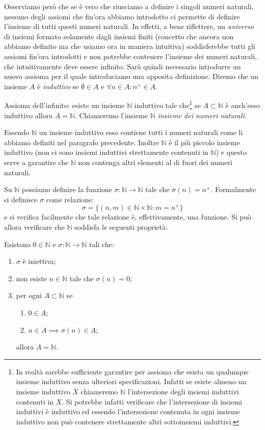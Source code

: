 \documentclass[italian,a4paper,hidelinks]{scrartcl}
\newcommand{\NN}{{\mathbb N}}
\newcommand{\myemph}[1]{\emph{#1}\marginpar{#1}}
\begin{document}
Osserviamo però che se è vero che riusciamo a definire i singoli numeri naturali,
nessuno degli assiomi che fin'ora abbiamo introdotto ci permette di definire
l'insieme di tutti questi numeri naturali.
In effetti, a bene riflettere, un \emph{universo} di insiemi formato solamente
dagli insiemi finiti (concetto che ancora non abbiamo definito ma che usiamo ora
in maniera intuitiva) soddisferebbe tutti gli assiomi fin'ora introdotti e non
potrebbe contenere l'insieme dei numeri naturali, che intuitivamente deve essere
infinito.
Sarà quindi necessario introdurre un nuovo assioma per il quale
introduciamo una apposita definizione.
Diremo che un insieme $A$ è \emph{induttivo} se $\emptyset \in A$
e $\forall n\in A\colon n^+\in A$.

Assioma dell'infinito:
esiste un insieme $\NN$ \marginpar{$\NN$}
induttivo
tale che\footnote{%
In realtà sarebbe sufficiente garantire per assioma che esista un qualunque insieme induttivo
senza ulteriori specificazioni. Infatti se esiste almeno un insieme induttivo
$X$ chiameremo $\mathbb N$
l'intersezione degli insiemi induttivi contenuti in $X$. Si potrebbe infatti
verificare che l'intersezione di insiemi induttivi è induttivo ed essendo
l'intersezione contenuta in ogni insieme induttivo non può contenere strettamente
altri sottoinsiemi induttivi.
}
se $A\subset \NN$ è anch'esso induttivo allora $A=\NN$.
Chiameremo l'insieme $\NN$
\myemph{insieme dei numeri naturali}.

Essendo $\NN$ un insieme induttivo esso contiene tutti i numeri naturali come
li abbiamo definiti nel paragrafo precedente.
Inoltre $\NN$ è il più piccolo insieme induttivo
(non ci sono insiemi induttivi strettamente contenuti in $\NN$) e questo
serve a garantire che $\NN$ non contenga altri elementi al di fuori dei numeri
naturali.

Su $\NN$ possiamo definire la funzione $\sigma \colon \NN \to \NN$
tale che $\sigma(n) = n^+$. Formalmente si definisce $\sigma$ come relazione:
\[
  \sigma = \{(n,m) \in \NN \times \NN\colon m = n^+\}
\]
e si verifica facilmente che tale relazione è, effettivamente, una funzione.
Si può allora verificare che $\NN$ soddisfa le seguenti proprietà:
\begin{theorem}
Esistono $0\in \NN$
e $\sigma\colon \NN \to \NN$ tali che:
\begin{enumerate}
\item $\sigma$ è iniettiva;
\item non esiste $n\in \NN$ tale che $\sigma(n)=0$;
\item per ogni $A\subset \NN$ se
\begin{enumerate}
   \item $0\in A$;
   \item $n\in A \implies \sigma(n) \in A$;
\end{enumerate}
allora $A= \NN$.
\end{enumerate}
\end{theorem}
\end{document}

